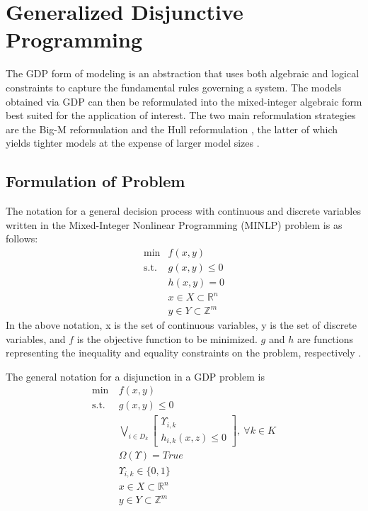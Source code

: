 \documentclass{juliacon}
\begin{document}
\section{Generalized Disjunctive Programming}
The GDP form of modeling is an abstraction that uses both algebraic and logical constraints to capture the fundamental rules governing a system. The models obtained via GDP can then be reformulated into the mixed-integer algebraic form best suited for the application of interest. The two main reformulation strategies are the Big-M reformulation \cite{nemhauser_1999, TRESPALACIOS201598} and the Hull reformulation \cite{LEE20002125}, the latter of which yields tighter models at the expense of larger model sizes \cite{grossmann_lee_2003}. 
\vskip 6pt

\subsection{Formulation of Problem}
The notation for a general decision process with continuous and discrete variables written in the Mixed-Integer Nonlinear Programming (MINLP) problem is as follows:
\begin{align*}
    \min &f(x, y) \\
    \text{s.t.} \ &g(x, y) \leq 0 \\
    & h(x, y) = 0 \\
    & x \in X \subset \mathbb{R}^n \\
    & y \in Y \subset \mathbb{Z}^m
\end{align*}
In the above notation, x is the set of continuous variables, y is the set of discrete variables, and $f$ is the objective function to be minimized. $g$ and $h$ are functions representing the inequality and equality constraints on the problem, respectively \cite{chen_grossmann_2019}.
\vskip 6pt

The general notation for a disjunction in a GDP problem is
\begin{align*}
    \min \ &f(x, y) \\
    \text{s.t.} \ &g(x, y) \leq 0 \\
    &\bigvee_{i \in D_k}
    \begin{bmatrix}
        \Upsilon_{i,k} \\
        h_{i,k}(x, z) \leq 0
    \end{bmatrix}, \ \forall k \in K \\
    & \Omega(\Upsilon) = True \\
    & \Upsilon_{i,k} \in \{0, 1\} \\
    & x \in X \subset \mathbb{R}^n \\
    & y \in Y \subset \mathbb{Z}^m
\end{align*}
\vskip 6pt
\end{document}
